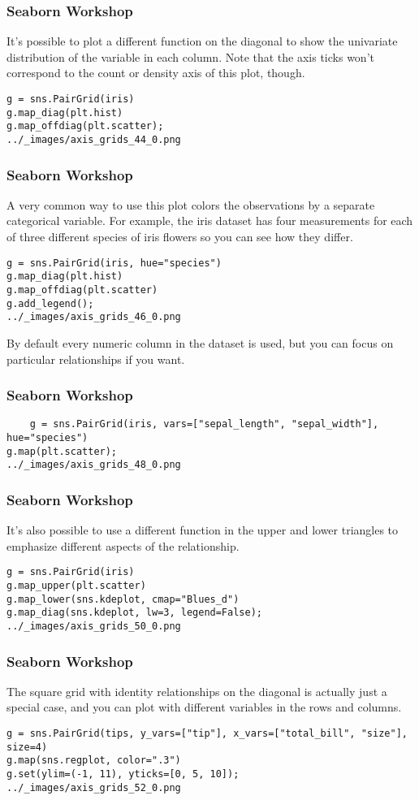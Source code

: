 \documentclass{beamer}
\begin{document}
\begin{frame}[fragile]
\frametitle{Seaborn Workshop}
\large
It’s possible to plot a different function on the diagonal to show the univariate distribution of the variable in each column. Note that the axis ticks won’t correspond to the count or density axis of this plot, though.
\begin{verbatim}
g = sns.PairGrid(iris)
g.map_diag(plt.hist)
g.map_offdiag(plt.scatter);
../_images/axis_grids_44_0.png
\end{verbatim}
\end{frame}
\begin{frame}[fragile]
\frametitle{Seaborn Workshop}
\large A very common way to use this plot colors the observations by a separate categorical variable. For example, the iris dataset has four measurements for each of three different species of iris flowers so you can see how they differ.
\begin{verbatim}
g = sns.PairGrid(iris, hue="species")
g.map_diag(plt.hist)
g.map_offdiag(plt.scatter)
g.add_legend();
../_images/axis_grids_46_0.png
\end{verbatim}
By default every numeric column in the dataset is used, but you can focus on particular relationships if you want.
\end{frame}
\begin{frame}[fragile]
	\frametitle{Seaborn Workshop}
	\large
\begin{verbatim}
	g = sns.PairGrid(iris, vars=["sepal_length", "sepal_width"], hue="species")
g.map(plt.scatter);
../_images/axis_grids_48_0.png
\end{verbatim}
\end{frame}
\begin{frame}[fragile]
	\frametitle{Seaborn Workshop}
	\large
It’s also possible to use a different function in the upper and lower triangles to emphasize different aspects of the relationship.
\begin{verbatim}
g = sns.PairGrid(iris)
g.map_upper(plt.scatter)
g.map_lower(sns.kdeplot, cmap="Blues_d")
g.map_diag(sns.kdeplot, lw=3, legend=False);
../_images/axis_grids_50_0.png
\end{verbatim}

\end{frame}
\begin{frame}[fragile]
\frametitle{Seaborn Workshop}
\large

The square grid with identity relationships on the diagonal is actually just a special case, and you can plot with different variables in the rows and columns.
\begin{verbatim}
g = sns.PairGrid(tips, y_vars=["tip"], x_vars=["total_bill", "size"], size=4)
g.map(sns.regplot, color=".3")
g.set(ylim=(-1, 11), yticks=[0, 5, 10]);
../_images/axis_grids_52_0.png
\end{verbatim}
\end{frame}
\end{document}
